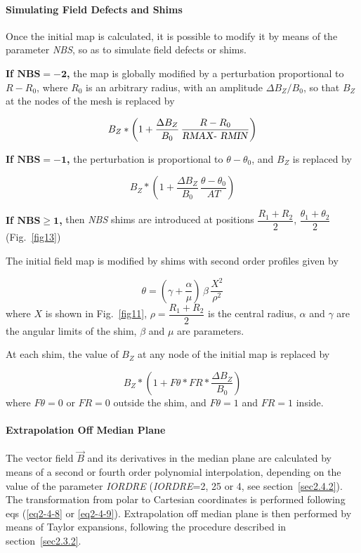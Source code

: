 \paragraph{Simulating Field Defects and Shims }

\noindent Once the initial map is calculated, it is possible to modify it by
means of the parameter \textsl{NBS}, so as to simulate field defects or shims. 
\bigskip

\noindent\textbf{If $\mathbf{NBS = - 2}$,} the map is globally modified by a
perturbation proportional to $ R-R_0 $, 
where $ R_0 $ is an arbitrary radius, with an amplitude $ \Delta B_Z/B_0 $, so
that $ B_Z $ at the nodes of the mesh is replaced by 

$$ B_Z  \ast   \left(1+ \dfrac{\Delta B_Z }{ B_0}\, \dfrac{R-R_0 }{\text{\textsl{RMAX}- \textsl{RMIN}}} \right) $$

\noindent\textbf{If  $\mathbf{NBS =  - 1}$,} the perturbation is proportional to
$ \theta -\theta_ 0 $, and $ B_Z $ is replaced by 

$$ B_Z \ast  \left(1+ \dfrac{\Delta B_Z }{ B_0} \, \dfrac{\theta -\theta_ 0 }{ AT}\right) $$

\noindent\textbf{If  $\mathbf{NBS \geq 1}$,} then \textsl{NBS} shims are introduced at
positions $ \dfrac{ R_1+R_2 }{ 2}$, $\dfrac{\theta_ 1+\theta_ 2 }{ 2} $ 
(Fig.~\ref{fig13})~\cite{Biblio13}   %

\noindent The initial field map is modified by shims with second order profiles given by 

$$ \theta  = \left(\gamma  + \dfrac{\alpha }{ \mu} \right) \,\beta\, \dfrac{X^2 }{\rho^ 2} $$
%
 where $ X $ is shown in  Fig.~\ref{fig11}, 
 $\rho = \dfrac{R_1+R_2 }{ 2} $ is the central radius, $\alpha$ and $\gamma$ are the angular 
 limits of the shim, $\beta$ and $\mu$ are parameters. 
 
\noindent At each shim, the value of $ B_Z $ at any node of the initial map is replaced by 

$$ B_Z \ast  \left(1+F\theta  \ast  FR \ast  \dfrac{\Delta B_Z }{ B_0} \right)
$$
%
 where $ F\theta =0 $ or $ FR=0 $ outside the shim, and $ F\theta =1$ and $ FR=1 $ inside.  
\bigskip

\paragraph{Extrapolation Off Median Plane} 

\noindent The vector field $ \vec  B $ and its derivatives in the median plane
are calculated by means of a second or fourth order polynomial 
interpolation, depending 
on the value of the parameter \textsl{IORDRE} (\textsl{IORDRE}=2, 25 or 4, see 
section~\ref{sec2.4.2}). 
The transformation from polar to Cartesian coordinates is 
performed following eqs (\ref{eq2-4-8} or \ref{eq2-4-9}). Extrapolation off median plane is then 
performed by means of Taylor expansions, following the procedure described 
in section~\ref{sec2.3.2}. 









